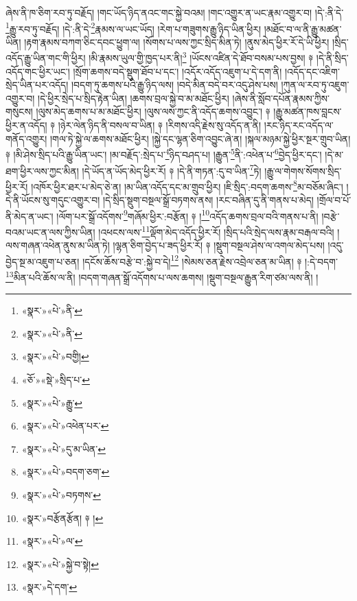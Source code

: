ཞེས་ནི་ཁ་ཅིག་རབ་ཏུ་བརྗོད། །གང་ཡོད་ཉིད་ནའང་གང་སྐྱེ་བའམ། །གང་འགྱུར་ན་ཡང་རྣམ་འགྱུར་བ། །དེ་:ནི་དེ་\footnote{«སྣར་»«པེ་»ནི་}རྒྱུ་རབ་ཏུ་བརྗོད། །དེ་:ནི་དེ་\footnote{«སྣར་»«པེ་»ནི་}རྣམས་ལ་ཡང་ཡོད། །རེག་པ་གཟུགས་རྒྱུ་ཉིད་ཡིན་ཕྱིར། །མཐོང་བ་ལ་ནི་རྒྱུ་མཚན་ཡིན། །རྟག་རྣམས་བཀག་ཅིང་དབང་ཕྱུག་ལ། །སོགས་པ་ལས་ཀྱང་སྲིད་མིན་ཏེ། །ནུས་མེད་ཕྱིར་རོ་དེ་ཡི་ཕྱིར། །སྲིད་འདོད་རྒྱུ་ཡིན་གང་གི་ཕྱིར། །མི་རྣམས་ཡུལ་གྱི་ཁྱད་པར་ནི།\footnote{«སྣར་»«པེ་»བགྱི།} །ཡོངས་འཛིན་དེ་ཐོབ་བསམ་པས་བྱས། ༈ །དེ་ནི་སྲིད་འདོད་གང་ཕྱིར་ཡང་། །སྲོག་ཆགས་བདེ་སྡུག་ཐོབ་པ་དང་། །འདོར་འདོད་འཇུག་པ་དེ་དག་ནི། །འདོད་དང་འཇིག་སྲེད་ཡིན་པར་འདོད། །བདག་ཏུ་ཆགས་པའི་རྒྱུ་ཉིད་ལས། །བདེ་མིན་བདེ་བར་འདུ་ཤེས་པས། །ཀུན་ལ་རབ་ཏུ་འཇུག་འགྱུར་བ། །དེ་ཕྱིར་སྲེད་པ་སྲིད་རྟེན་ཡིན། །ཆགས་བྲལ་སྐྱེ་བ་མ་མཐོང་ཕྱིར། །ཞེས་ནི་སློབ་དཔོན་རྣམས་ཀྱིས་གསུངས། །ལུས་མེད་ཆགས་པ་མ་མཐོང་ཕྱིར། །ལུས་ལས་ཀྱང་ནི་འདོད་ཆགས་འབྱུང་། ༈ །རྒྱུ་མཚན་ཁས་བླངས་ཕྱིར་ན་འདོད། ༈ །ཉེར་ལེན་ཉིད་ནི་བསལ་བ་ཡིན། ༈ །རིགས་འདི་རྗེས་སུ་འདོད་ན་ནི། །རང་ཉིད་རང་འདོད་ལ་གནོད་འགྱུར། །གལ་ཏེ་སྐྱེ་ལ་ཆགས་མཐོང་ཕྱིར། །སྐྱེ་དང་ལྷན་ཅིག་འབྱུང་ཞེ་ན། །སྐལ་མཉམ་སྐྱེ་ཕྱིར་སྔར་གྲུབ་ཡིན། ༈ །མི་ཤེས་སྲིད་པའི་རྒྱུ་ཡིན་ཡང་། །མ་བརྗོད་:སྲེད་པ་\footnote{«ཅོ་»«སྡེ་»སྲིད་པ་}ཉིད་བཤད་པ། །རྒྱུན་\footnote{«སྣར་»«པེ་»རྒྱུ་}ནི་:འཕེན་པ་\footnote{«སྣར་»«པེ་»འཕེན་པར་}བྱེད་ཕྱིར་དང་། །དེ་མ་ཐག་ཕྱིར་ལས་ཀྱང་མིན། །དེ་ཡོད་ན་ཡོད་མེད་ཕྱིར་རོ། ༈ །དེ་ནི་གཏན་:དུ་བ་ཡིན་\footnote{«སྣར་»«པེ་»དུ་མ་ཡིན་}ཏེ། །རྒྱུ་ལ་གེགས་སོགས་སྲིད་ཕྱིར་རོ། །འཁོར་ཕྱིར་ཐར་པ་མེད་ཅེ་ན། །མ་ཡིན་འདོད་དང་མ་གྲུབ་ཕྱིར། །ཇི་སྲིད་:བདག་ཆགས་\footnote{«སྣར་»«པེ་»བདག་ཅག་}མ་བཅོམ་ཞིང་། །དེ་ནི་ཡོངས་སུ་གདུང་འགྱུར་བ། །དེ་སྲིད་སྡུག་བསྔལ་སྒྲོ་བཏགས་ནས། །རང་བཞིན་དུ་ནི་གནས་པ་མེད། །གྲོལ་བ་པོ་ནི་མེད་ན་ཡང་། །ལོག་པར་སྒྲོ་འདོགས་\footnote{«སྣར་»«པེ་»བཏགས་}གཞོམ་ཕྱིར་:བརྩོན། ༈ །\footnote{«སྣར་»བརྩོནརྩོན། ༈ །}འདོད་ཆགས་བྲལ་བའི་གནས་པ་ནི། །བརྩེ་བའམ་ཡང་ན་ལས་ཀྱིས་ཡིན། །འཕངས་ལས་\footnote{«སྣར་»«པེ་»ལ་}ལྡོག་མེད་འདོད་ཕྱིར་རོ། །སྲིད་པའི་སྲེད་ལས་རྣམ་བརྒལ་བའི། །ལས་གཞན་འཕེན་ནུས་མ་ཡིན་ཏེ། །ལྷན་ཅིག་བྱེད་པ་ཟད་ཕྱིར་རོ། ༈ །སྡུག་བསྔལ་ཤེས་ལ་འགལ་མེད་པས། །འདུ་བྱེད་སྔ་མ་འཇུག་པ་ཅན། །དངོས་ཆོས་བརྩེ་བ་:སྐྱེ་བ་དེ།\footnote{«སྣར་»«པེ་»སྐྱེ་བ་སྟེ།} །སེམས་ཅན་རྗེས་འབྲེལ་ཅན་མ་ཡིན། ༈ །:དེ་བདག་\footnote{«སྣར་»དེ་དག་}མིན་པའི་ཆོས་ལ་ནི། །བདག་གཞན་སྒྲོ་འདོགས་པ་ལས་ཆགས། །སྡུག་བསྔལ་རྒྱུན་རིག་ཙམ་ལས་ནི། །
